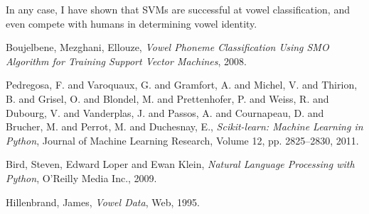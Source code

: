 \documentclass[twoside]{article}
\begin{document}
\begin{multicols}{2}
In any case, I have shown that SVMs are successful at vowel classification, and even compete with humans in determining vowel identity.

\begin{thebibliography}{9}

  Boujelbene, Mezghani, Ellouze,
  \emph{Vowel Phoneme Classification Using SMO Algorithm for Training Support Vector Machines},
  2008.

  Pedregosa, F. and Varoquaux, G. and Gramfort, A. and Michel, V. and Thirion, B. and Grisel, O. and Blondel, M. and Prettenhofer, P. and Weiss, R. and Dubourg, V. and Vanderplas, J. and Passos, A. and Cournapeau, D. and Brucher, M. and Perrot, M. and Duchesnay, E.,
  \emph{Scikit-learn: Machine Learning in {P}ython},
  Journal of Machine Learning Research,
  Volume 12, pp. 2825--2830, 2011.
  
  Bird, Steven, Edward Loper and Ewan Klein,
  \emph{Natural Language Processing with Python},
  O'Reilly Media Inc., 2009.
  
	Hillenbrand, James,
	\emph{Vowel Data},
	Web, 1995.

\end{thebibliography}

\end{multicols}
\end{document}
